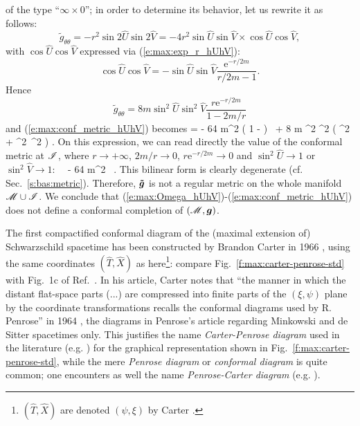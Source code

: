 of the type ``$\infty\times 0$''; in order to determine its behavior, let
us rewrite it as follows:
\[
    {\tilde{g}}_{\theta\theta} = -  r^2 \sin 2\hat{U} \sin 2\hat{V}
        = - 4 r^2 \sin\hat{U}\sin\hat{V} \times \cos\hat{U}\cos\hat{V},
\]
with $\cos\hat{U}\cos\hat{V}$ expressed via (\ref{e:max:exp_r_hUhV}):
\[
    \cos\hat{U}\cos\hat{V} = - \sin\hat{U} \sin\hat{V}
    \frac{\mathrm{e}^{-r/2m}}{r/2m - 1} .
\]
Hence
\[
    {\tilde{g}}_{\theta\theta} = 8 m \sin^2\hat{U} \sin^2\hat{V}
    \frac{ r \mathrm{e}^{-r/2m}}{1 - 2m/r}
\]
and (\ref{e:max:conf_metric_hUhV}) becomes
\be
    =
     - 64 m^2 \left( 1 -  \right)
    \dd {} \, \dd {}
     + 8 m \sin^2 \sin^2
     \left( \dd\th^2 + \sin^2\th\, \dd\ph^2 \right) .
\ee
On this expression, we can read directly the value of the conformal metric
at $\mathscr{I}$,  where $r\rightarrow +\infty$, $2m/r \rightarrow 0$,
$r \mathrm{e}^{-r/2m}\rightarrow 0$ and
$\sin^2\hat{U}\rightarrow 1$ or
$\sin^2\hat{V}\rightarrow 1$:
\be \label{e:max:conf_metric_scri}
    \ \stackrel{\scri}{=}\  - 64 m^2 \dd {} \, \dd {} .
\ee
This bilinear form is clearly degenerate (cf. Sec.~\ref{s:bas:metric}).
Therefore, $\bm{\tilde{g}}$ is not a
regular metric on the whole manifold $\mathscr{M}\cup\mathscr{I}$.
We conclude that (\ref{e:max:Omega_hUhV})-(\ref{e:max:conf_metric_hUhV}) does
not define a conformal completion of $(\mathscr{M},\bm{g})$.

\begin{hist} \label{h:max:CP-diag}
The first compactified conformal diagram of the (maximal extension of) Schwarzschild
spacetime has been constructed by Brandon Carter in 1966 \cite{Carte66}, using the same coordinates $(\hat{T},\hat{X})$ as here\footnote{
$(\hat{T},\hat{X})$ are denoted $(\psi,\xi)$ by Carter \cite{Carte66}.}: compare Fig.~\ref{f:max:carter-penrose-std} with Fig.~1c of Ref.~\cite{Carte66}.
In his article, Carter notes that ``the manner in which the distant flat-space
parts (...) are compressed into finite parts of the $(\xi,\psi)$ plane by the
coordinate transformations recalls the conformal diagrams used by R. Penrose''
in 1964 \cite{Penro64}, the diagrams in Penrose's article \cite{Penro64}
regarding Minkowski and de Sitter spacetimes only.
This justifies the name \emph{Carter-Penrose diagram}
used in the literature (e.g. \cite{FroloZ11,Chrus20}) for the graphical representation shown in Fig.~\ref{f:max:carter-penrose-std}, while the mere
\emph{Penrose diagram} or \emph{conformal diagram}
is quite common;
one encounters as well the name \emph{Penrose-Carter diagram}
(e.g. \cite{FroloN98,Poiss04}).
\end{hist}

